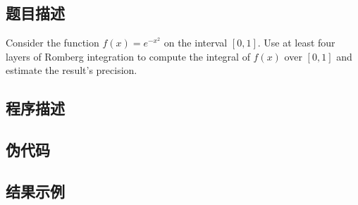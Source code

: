 \subsection{题目描述}
\noindent Consider the function \( f(x) = e^{-x^2} \) on the interval \([0,1]\). Use at least four layers of Romberg integration to compute the integral of \( f(x) \) over \([0,1]\) and estimate the result's precision.

\subsection{程序描述}


\subsection{伪代码}



\subsection{结果示例}

